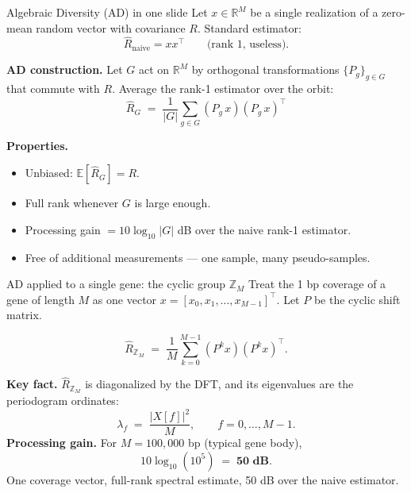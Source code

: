 \documentclass[aspectratio=169,10pt]{beamer}
\begin{document}
\begin{frame}{Algebraic Diversity (AD) in one slide}
Let $x \in \mathbb{R}^M$ be a single realization of a
zero-mean random vector with covariance $R$. Standard estimator:
\[
  \hat{R}_{\mathrm{naive}} = x x^\top \qquad \text{(rank 1, useless)}.
\]

\textbf{AD construction.} Let $G$ act on $\mathbb{R}^M$ by orthogonal
transformations $\{P_g\}_{g\in G}$ that commute with $R$.
Average the rank-1 estimator over the orbit:
\[
  \boxed{\;\hat{R}_G \;=\; \frac{1}{|G|} \sum_{g \in G} (P_g\, x)(P_g\, x)^\top\;}
\]

\textbf{Properties.}
\begin{itemize}\small
  \item Unbiased: $\mathbb{E}[\hat{R}_G] = R$.
  \item Full rank whenever $G$ is large enough.
  \item \alert{Processing gain $= 10\log_{10}|G|$ dB}
        over the naive rank-1 estimator.
  \item Free of additional measurements --- one sample, many pseudo-samples.
\end{itemize}
\end{frame}

\begin{frame}{AD applied to a single gene: the cyclic group $\mathbb{Z}_M$}
Treat the 1 bp coverage of a gene of length $M$ as one vector
$x = [x_0, x_1, \ldots, x_{M-1}]^\top$. Let $P$ be the cyclic shift matrix.

\[
  \hat{R}_{\mathbb{Z}_M} \;=\; \frac{1}{M}\sum_{k=0}^{M-1} (P^k x)(P^k x)^\top.
\]

\textbf{Key fact.} $\hat{R}_{\mathbb{Z}_M}$ is diagonalized by the DFT,
and its eigenvalues are the periodogram ordinates:
\[
  \lambda_f \;=\; \frac{|X[f]|^2}{M}, \qquad f = 0,\ldots,M-1.
\]
\textbf{Processing gain.} For $M = 100{,}000$ bp (typical gene body),
\[
  10\log_{10}(10^5) \;=\; \textbf{50 dB}.
\]
One coverage vector, full-rank spectral estimate, 50 dB over the naive
estimator.
\end{frame}
\end{document}
